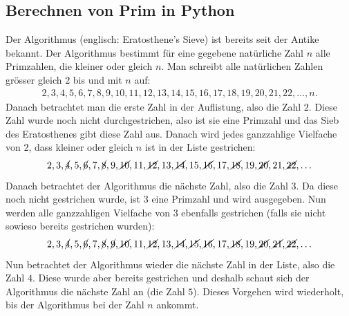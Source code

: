 	\subsection{Berechnen von  Prim in Python}
	Der Algorithmus  (englisch: Eratosthene's Sieve) ist bereits seit der Antike bekannt. Der Algorithmus bestimmt für eine gegebene natürliche Zahl $n$ alle Primzahlen, die kleiner oder gleich $n$. Man schreibt alle natürlichen Zahlen grösser gleich $2$ bis und mit $n$ auf:
	\begin{align*}
		2, 3, 4, 5, 6, 7, 8, 9, 10, 11, 12, 13, 14, 15, 16, 17, 18, 19, 20, 21, 22, \ldots , n.
	\end{align*}
	Danach betrachtet man die erste Zahl in der Auflistung, also die Zahl $2$. Diese Zahl wurde noch nicht durchgestrichen, also ist sie eine Primzahl und das Sieb des Eratosthenes gibt diese Zahl aus. Danach wird jedes ganzzahlige Vielfache von $2$, dass kleiner oder gleich $n$ ist in der Liste gestrichen:
	\begin{align*}
		2, 3, \cancel{4}, 5, \cancel{6}, 7, \cancel{8}, 9, \cancel{10}, 11, \cancel{12}, 13, \cancel{14}, 15, \cancel{16}, 17, \cancel{18}, 19, \cancel{20}, 21, \cancel{22}, \ldots
	\end{align*}
	Danach betrachtet der Algorithmus die nächste Zahl, also die Zahl $3$. Da diese noch nicht gestrichen wurde, ist $3$ eine Primzahl und wird ausgegeben. Nun werden alle ganzzahligen Vielfache von $3$ ebenfalls gestrichen (falls sie nicht sowieso bereits gestrichen wurden):
	\begin{align*}
		2, 3, \cancel{4}, 5, \cancel{6}, 7, \cancel{8}, \cancel{9}, \cancel{10}, 11, \cancel{12}, 13, \cancel{14}, \cancel{15}, \cancel{16}, 17, \cancel{18}, 19, \cancel{20}, \cancel{21}, \cancel{22}, \ldots
	\end{align*}
	Nun betrachtet der Algorithmus wieder die nächste Zahl in der Liste, also die Zahl $4$. Diese wurde aber bereits gestrichen und deshalb schaut sich der Algorithmus die nächste Zahl an (die Zahl $5$). Dieses Vorgehen wird wiederholt, bis der Algorithmus bei der Zahl $n$ ankommt.
